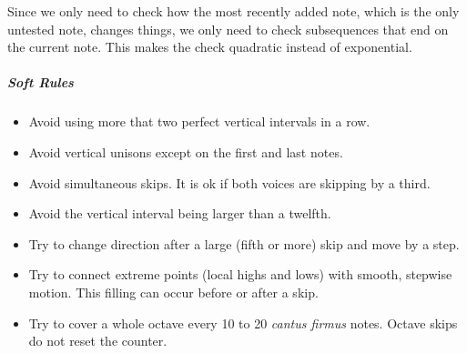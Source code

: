 \begin{enumerate}
					Since we only need to check how the most recently added note, which is the only untested note, changes things, we only need to check subsequences that end on the current note.
					This makes the check quadratic instead of exponential.
	\end{enumerate}
\subparagraph{Soft Rules}
	\begin{itemize}
		\item Avoid using more that two perfect vertical intervals in a row.
		\item Avoid vertical unisons except on the first and last notes.
		\item Avoid simultaneous skips. It is ok if both voices are skipping by a third.
		\item Avoid the vertical interval being larger than a twelfth.
		\item Try to change direction after a large (fifth or more) skip and move by a step.
		\item Try to connect extreme points (local highs and lows) with smooth, stepwise motion. This filling can occur before or after a skip.
		\item Try to cover a whole octave every 10 to 20 \emph{cantus firmus} notes. Octave skips do not reset the counter.
	\end{itemize}

